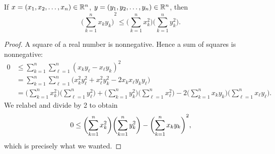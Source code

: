 \begin{lemma}
If $x =(x_1,x_2,\ldots,x_n) \in {\mathbb{R}}^n$, $y =(y_1,y_2,\ldots,y_n) \in
{\mathbb{R}}^n$, then
\begin{equation*}
{\biggl( \sum_{k=1}^n x_k y_k \biggr)}^2
\leq
\biggl(\sum_{k=1}^n x_k^2 \biggr)
\biggl(\sum_{k=1}^n y_k^2 \biggr) .
\end{equation*}
\end{lemma}

\begin{proof}
A square of a real number is nonnegative.  Hence a sum of squares is
nonnegative:
\begin{equation*}
\begin{split}
0 & \leq 
\sum_{k=1}^n \sum_{\ell=1}^n {(x_k y_\ell - x_\ell y_k)}^2
\\
& =
\sum_{k=1}^n \sum_{\ell=1}^n \bigl( x_k^2 y_\ell^2 + x_\ell^2 y_k^2 - 2 x_k
x_\ell y_k
y_\ell \bigr)
\\
& =
\biggl( \sum_{k=1}^n x_k^2 \biggr)
\biggl( \sum_{\ell=1}^n y_\ell^2 \biggr)
+
\biggl( \sum_{k=1}^n y_k^2 \biggr)
\biggl( \sum_{\ell=1}^n x_\ell^2 \biggr)
-
2
\biggl( \sum_{k=1}^n x_k y_k \biggr)
\biggl( \sum_{\ell=1}^n x_\ell y_\ell \biggr) .
\end{split}
\end{equation*}
We relabel and divide by 2 to obtain
\begin{equation*}
0 \leq 
\biggl( \sum_{k=1}^n x_k^2 \biggr)
\biggl( \sum_{k=1}^n y_k^2 \biggr)
-
{\biggl( \sum_{k=1}^n x_k y_k \biggr)}^2 ,
\avoidbreak
\end{equation*}
which is precisely what we wanted.
\end{proof}

